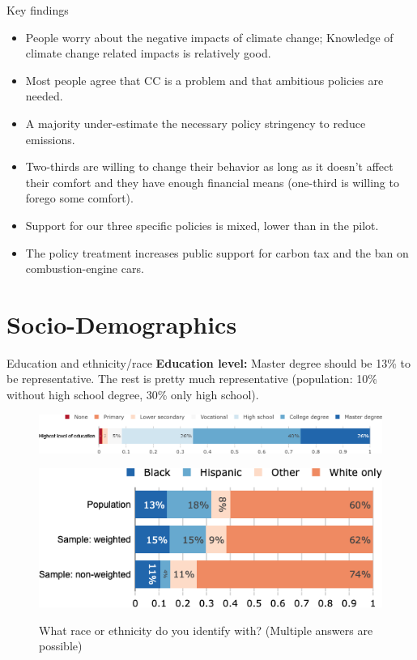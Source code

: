 \documentclass[aspectratio=169,9pt,dvipsnames]{beamer}
\begin{document}
\begin{frame}{Key findings}
\begin{itemize}
\item People worry about the negative impacts of climate change; Knowledge of climate change related impacts is relatively good.

\item Most people agree that CC is a problem and that ambitious policies are needed.

\item A majority under-estimate the necessary policy stringency to reduce emissions.

\item Two-thirds are willing to change their behavior as long as it doesn’t affect their comfort and they have enough financial means (one-third is willing to forego some comfort).

\item Support for our three specific policies is mixed, lower than in the pilot.

\item The policy treatment increases public support for carbon tax and the ban on combustion-engine cars.
\end{itemize}
\end{frame}

\section{Socio-Demographics}
\begin{frame}{Education and ethnicity/race}%
\textbf{Education level:} Master degree should be 13\% to be representative. The rest is pretty much representative (population: 10\% without high school degree, 30\% only high school).
    \hspace{.2cm}
\begin{figure}[h!]
\centering
\caption{What is the highest level of education you have completed?}
\includegraphics[width=.9\textwidth]{../figures/US/education_US.png} \\
\vspace{.3cm}
\caption{What race or ethnicity do you identify with? (Multiple answers are possible)}
\includegraphics[width=.5\textwidth]{../figures/US/race_US_comp.png}\\
\end{figure}
\end{frame}
\end{document}
